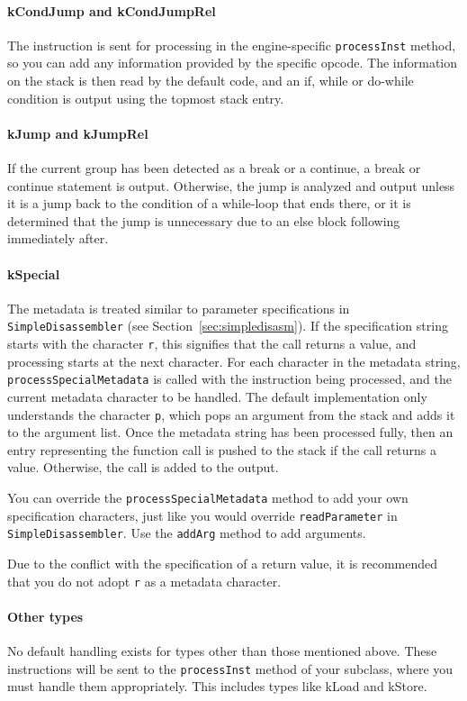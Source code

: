 \paragraph{kCondJump and kCondJumpRel}
The instruction is sent for processing in the engine-specific \verb+processInst+ method, so you can add any information provided by the specific opcode. The information on the stack is then read by the default code, and an if, while or do-while condition is output using the topmost stack entry.

\paragraph{kJump and kJumpRel}
If the current group has been detected as a break or a continue, a break or continue statement is output. Otherwise, the jump is analyzed and output unless it is a jump back to the condition of a while-loop that ends there, or it is determined that the jump is unnecessary due to an else block following immediately after.

\paragraph{kSpecial}
The metadata is treated similar to parameter specifications in \verb+SimpleDisassembler+ (see Section~\vref{sec:simpledisasm}). If the specification string starts with the character \verb+r+, this signifies that the call returns a value, and processing starts at the next character.
For each character in the metadata string, \verb+processSpecialMetadata+ is called with the instruction being processed, and the current metadata character to be handled. The default implementation only understands the character \verb+p+, which pops an argument from the stack and adds it to the argument list.
Once the metadata string has been processed fully, then an entry representing the function call is pushed to the stack if the call returns a value. Otherwise, the call is added to the output.

You can override the \verb+processSpecialMetadata+ method to add your own specification characters, just like you would override \verb+readParameter+ in \verb+SimpleDisassembler+. Use the \verb+addArg+ method to add arguments.

Due to the conflict with the specification of a return value, it is recommended that you do not adopt \verb+r+ as a metadata character.

\paragraph{Other types}
No default handling exists for types other than those mentioned above. These instructions will be sent to the \verb+processInst+ method of your subclass, where you must handle them appropriately. This includes types like kLoad and kStore.

